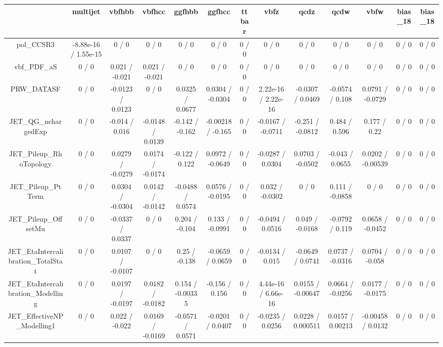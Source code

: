 \documentclass[10pt]{article}
\begin{document}
\begin{table}[htbp]
\begin{center}
\begin{tabular}{|c|c|c|c|c|c|c|c|c|c|c|c|c|}
\hline 
      & multijet      & vbfhbb      & vbfhcc      & ggfhbb      & ggfhcc      & ttbar      & vbfz      & qcdz      & qcdw      & vbfw      & bias_18      & bias_18 \\ 
\hline 
  pol_CCSR3 & -8.88e-16 / 1.55e-15 & 0 / 0 & 0 / 0 & 0 / 0 & 0 / 0 & 0 / 0 & 0 / 0 & 0 / 0 & 0 / 0 & 0 / 0 & 0 / 0 & 0 / 0 \\ 
  vbf_PDF_aS & 0 / 0 & 0.021 / -0.021 & 0.021 / -0.021 & 0 / 0 & 0 / 0 & 0 / 0 & 0 / 0 & 0 / 0 & 0 / 0 & 0 / 0 & 0 / 0 & 0 / 0 \\ 
  PRW_DATASF & 0 / 0 & -0.0123 / 0.0123 & 0 / 0 & 0.0325 / 0.0677 & 0.0304 / -0.0304 & 0 / 0 & 2.22e-16 / 2.22e-16 & -0.0307 / 0.0469 & -0.0574 / 0.108 & 0.0791 / -0.0729 & 0 / 0 & 0 / 0 \\ 
  JET_QG_nchargedExp & 0 / 0 & -0.014 / 0.016 & -0.0148 / 0.0139 & -0.142 / -0.162 & -0.00218 / -0.165 & 0 / 0 & -0.0167 / -0.0711 & -0.251 / -0.0812 & 0.484 / 0.596 & 0.177 / 0.22 & 0 / 0 & 0 / 0 \\ 
  JET_Pileup_RhoTopology & 0 / 0 & 0.0279 / -0.0279 & 0.0174 / -0.0174 & -0.122 / 0.122 & 0.0972 / -0.0649 & 0 / 0 & -0.0287 / 0.0304 & 0.0703 / -0.0502 & -0.043 / 0.0655 & 0.0202 / -0.00539 & 0 / 0 & 0 / 0 \\ 
  JET_Pileup_PtTerm & 0 / 0 & 0.0304 / -0.0304 & 0.0142 / -0.0142 & -0.0488 / 0.0574 & 0.0576 / -0.0195 & 0 / 0 & 0.032 / -0.0302 & 0 / 0 & 0.111 / -0.0858 & 0 / 0 & 0 / 0 & 0 / 0 \\ 
  JET_Pileup_OffsetMu & 0 / 0 & -0.0337 / 0.0337 & 0 / 0 & 0.204 / -0.104 & 0.133 / -0.0991 & 0 / 0 & -0.0494 / 0.0516 & 0.049 / -0.0168 & -0.0792 / 0.119 & 0.0658 / -0.0452 & 0 / 0 & 0 / 0 \\ 
  JET_EtaIntercalibration_TotalStat & 0 / 0 & 0.0107 / -0.0107 & 0 / 0 & 0.25 / -0.138 & -0.0659 / 0.0659 & 0 / 0 & -0.0134 / 0.015 & -0.0649 / 0.0741 & 0.0737 / -0.0316 & 0.0704 / -0.058 & 0 / 0 & 0 / 0 \\ 
  JET_EtaIntercalibration_Modelling & 0 / 0 & 0.0197 / -0.0197 & 0.0182 / -0.0182 & 0.154 / -0.00335 & -0.156 / 0.156 & 0 / 0 & 4.44e-16 / 6.66e-16 & 0.0155 / -0.00647 & 0.0664 / -0.0256 & 0.0177 / -0.0175 & 0 / 0 & 0 / 0 \\ 
  JET_EffectiveNP_Modelling1 & 0 / 0 & 0.022 / -0.022 & 0.0169 / -0.0169 & -0.0571 / 0.0571 & -0.0201 / 0.0407 & 0 / 0 & -0.0235 / 0.0256 & 0.0228 / 0.000511 & 0.0157 / 0.00213 & -0.00458 / 0.0132 & 0 / 0 & 0 / 0 \\ 

\end{tabular}
\end{center}
\end{table}
\end{document}
